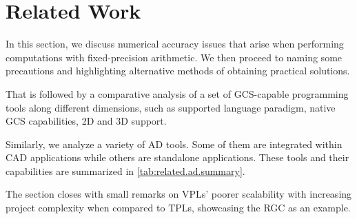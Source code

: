 \section{Related Work}%
\label{sec:related}

In this section, we discuss numerical accuracy issues that arise when performing
computations with fixed-precision arithmetic.  We then proceed to naming some
precautions and highlighting alternative methods of obtaining practical
solutions.

That is followed by a comparative analysis of a set of \ac{GCS}-capable
programming tools along different dimensions, such as supported language
paradigm, native \ac{GCS} capabilities, 2D and 3D support.

Similarly, we analyze a variety of \ac{AD} tools.  Some of them are integrated
within \ac{CAD} applications while others are standalone applications.  These
tools and their capabilities are summarized in \cref{tab:related.ad.summary}.

The section closes with small remarks on \acp{VPL}' poorer scalability with
increasing project complexity when compared to \acp{TPL}, showcasing the
\ac{RGC} as an example.





